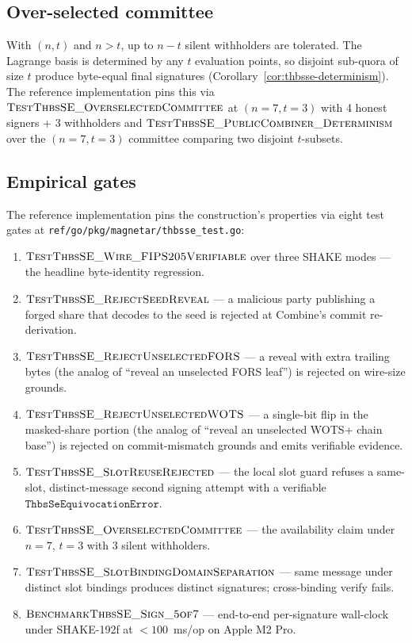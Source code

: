 \subsection{Over-selected committee}
\label{sec:thbsse:overselect}

With $(n, t)$ and $n > t$, up to $n - t$ silent withholders are
tolerated. The Lagrange basis is determined by any $t$
evaluation points, so disjoint sub-quora of size $t$ produce
byte-equal final signatures
(Corollary~\ref{cor:thbsse-determinism}). The reference
implementation pins this via
$\textsc{TestThbsSE\_OverselectedCommittee}$ at
$(n=7, t=3)$ with 4 honest signers + 3 withholders and
$\textsc{TestThbsSE\_PublicCombiner\_Determinism}$ over the
$(n=7, t=3)$ committee comparing two disjoint $t$-subsets.

\subsection{Empirical gates}
\label{sec:thbsse:gates}

The reference implementation pins the construction's properties
via eight test gates at
\texttt{ref/go/pkg/magnetar/thbsse\_test.go}:

\begin{enumerate}[leftmargin=2em,nosep]
  \item $\textsc{TestThbsSE\_Wire\_FIPS205Verifiable}$ over
        three SHAKE modes --- the headline byte-identity
        regression.
  \item $\textsc{TestThbsSE\_RejectSeedReveal}$ --- a malicious
        party publishing a forged share that decodes to the
        seed is rejected at Combine's commit re-derivation.
  \item $\textsc{TestThbsSE\_RejectUnselectedFORS}$ --- a
        reveal with extra trailing bytes (the analog of
        ``reveal an unselected FORS leaf'') is rejected on
        wire-size grounds.
  \item $\textsc{TestThbsSE\_RejectUnselectedWOTS}$ --- a
        single-bit flip in the masked-share portion (the analog
        of ``reveal an unselected WOTS+ chain base'') is
        rejected on commit-mismatch grounds and emits
        verifiable evidence.
  \item $\textsc{TestThbsSE\_SlotReuseRejected}$ --- the local
        slot guard refuses a same-slot, distinct-message second
        signing attempt with a verifiable
        $\texttt{ThbsSeEquivocationError}$.
  \item $\textsc{TestThbsSE\_OverselectedCommittee}$ --- the
        availability claim under $n = 7$, $t = 3$ with 3
        silent withholders.
  \item $\textsc{TestThbsSE\_SlotBindingDomainSeparation}$ ---
        same message under distinct slot bindings produces
        distinct signatures; cross-binding verify fails.
  \item $\textsc{BenchmarkThbsSE\_Sign\_5of7}$ --- end-to-end
        per-signature wall-clock under SHAKE-192f at
        $< 100$~ms/op on Apple M2 Pro.
\end{enumerate}

